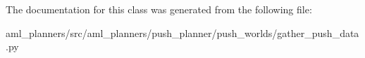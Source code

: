 The documentation for this class was generated from the following file\-:\begin{DoxyCompactItemize}
\item 
aml\-\_\-planners/src/aml\-\_\-planners/push\-\_\-planner/push\-\_\-worlds/gather\-\_\-push\-\_\-data.\-py\end{DoxyCompactItemize}
